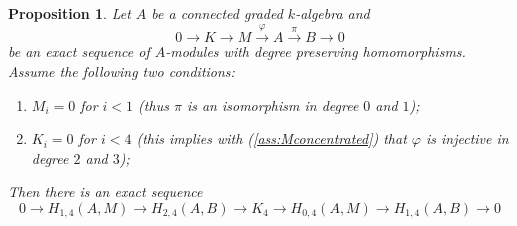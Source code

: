 \documentclass[10pt,a4paper]{amsart}
\newtheorem{prop}{Proposition}
\begin{document}
\begin{prop}
    \label{prop:HomologicalAlgebra}
    Let $A$ be a connected graded $k$-algebra and 
    \begin{equation*}
        0\to K\to M\overset{\varphi}{\to}A\overset{\pi}{\to}B\to 0
    \end{equation*}
     be an exact sequence of $A$-modules with degree preserving homomorphisms. Assume the following two conditions:
    \begin{enumerate}
        \item \label{ass:Mconcentrated} $M_i=0$ for $i< 1$ (thus $\pi$ is an isomorphism in degree $0$ and $1$);
        \item \label{ass:Kconcentrated} $K_i=0$ for $i<4$ (this implies with (\ref{ass:Mconcentrated}) that $\varphi$ is injective in degree $2$ and $3$);
    \end{enumerate}
    Then there is an exact sequence
    \begin{equation*}
            0\to H_{1,4}(A,M) \to H_{2,4}(A,B)\to K_4\to H_{0,4}(A,M)\to H_{1,4}(A,B)\to 0
    \end{equation*}
\end{prop}
\end{document}
